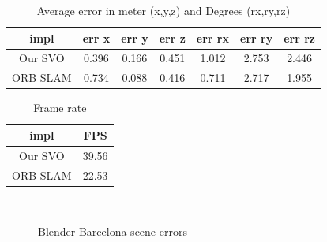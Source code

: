 \documentclass[11pt,a4paper,titlepage,oneside]{report}
\begin{document}
\begin{table}[H]
  \centering
  \begin{tabular}{|c|c|c|c|c|c|c|}
    impl & err x & err y & err z & err rx & err ry & err rz\\
    \hline
    Our SVO & 0.396 & 0.166 & 0.451 & 1.012 & 2.753 & 2.446\\
    ORB SLAM & 0.734 & 0.088 & 0.416 & 0.711 & 2.717 & 1.955
  \end{tabular}
\caption{Average error in meter (x,y,z) and Degrees (rx,ry,rz)}
\label{tab:barcelona_average}
\end{table}

\begin{table}[H]
  \centering
  \begin{tabular}{|c|c|}
  impl & FPS\\
  \hline
  Our SVO & 39.56\\
  ORB SLAM & 22.53
\end{tabular}
\caption{Frame rate}
\label{tab:barcelona_fps}
\end{table}

\begin{figure}[H]
  \\
  \caption{Blender Barcelona scene errors}\label{fig:blender_barcelona_diff}
\end{figure}
\end{document}
